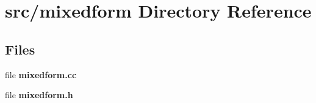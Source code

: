 \section{src/mixedform Directory Reference}
\label{dir_e63f4c63e9abda16bf1eac9abf265263}
\subsection*{Files}
\begin{DoxyCompactItemize}
\item 
file {\bf mixedform.\-cc}
\item 
file {\bf mixedform.\-h}
\end{DoxyCompactItemize}
